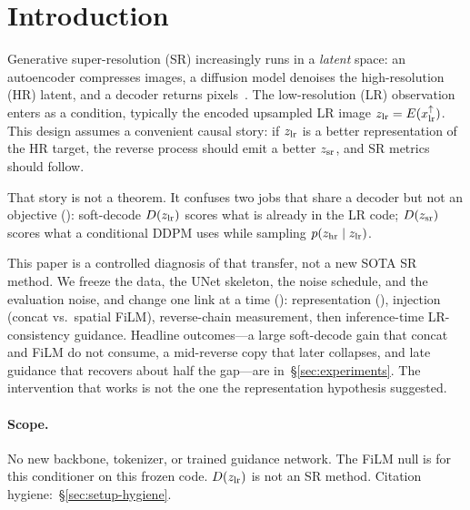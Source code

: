 \section{Introduction}
\label{sec:intro}

Generative super-resolution (SR) increasingly runs in a
\emph{latent} space: an autoencoder compresses images, a diffusion
model denoises the high-resolution (HR) latent, and a decoder returns
pixels~\citep{rombach2022high,saharia2023image,wang2024exploiting}.
The low-resolution (LR) observation enters as a condition, typically
the encoded upsampled LR image $z_{\mathrm{lr}}=E(x_{\mathrm{lr}}^{\uparrow})$.
This design assumes a convenient causal story:
if $z_{\mathrm{lr}}$ is a better representation of the HR target, the reverse
process should emit a better $z_{\mathrm{sr}}$, and SR metrics should follow.

That story is not a theorem.
It confuses two jobs that share a decoder but not an objective
():
soft-decode $D(z_{\mathrm{lr}})$ scores what is already in the LR code;
\lsrmethod{} $D(z_{\mathrm{sr}})$ scores what a conditional DDPM uses while
sampling $p(z_{\mathrm{hr}}\mid z_{\mathrm{lr}})$.

This paper is a controlled diagnosis of that transfer, not a new
SOTA SR method.
We freeze the data, the UNet skeleton, the noise schedule, and the
evaluation noise, and change one link at a time
(): representation (\vaesr), injection
(concat vs.\ spatial FiLM), reverse-chain measurement, then
inference-time LR-consistency guidance.
Headline outcomes---a large soft-decode gain that concat and FiLM
do not consume, a mid-reverse copy that later collapses, and late
guidance that recovers about half the gap---are in~\S\ref{sec:experiments}.
The intervention that works is not the one the representation
hypothesis suggested.

\paragraph{Scope.}
No new backbone, tokenizer, or trained guidance network.
The FiLM null is for this conditioner on this frozen \vaesr{} code.
$D(z_{\mathrm{lr}})$ is not an SR method.
Citation hygiene:~\S\ref{sec:setup-hygiene}.

